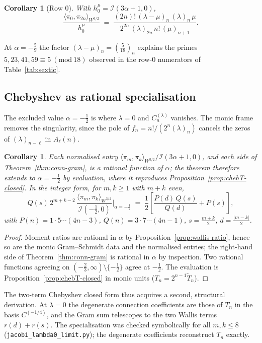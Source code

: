 \documentclass[11pt,a4paper]{article}
\newtheorem{corollary}[theorem]{Corollary}
\begin{document}
\begin{corollary}[Row $0$]\label{cor:row0}
  With $h_0^\mu=\mathcal{I}(3\alpha+1,0)$,
  \[
    \frac{\langle\pi_0,\pi_{2n}\rangle_{W^{3/2}}}{h_0^{\mu}}
    \;=\;\frac{(2n)!\,(\lambda-\mu)_n\,(\lambda)_n\,\mu}
             {2^{2n}\,(\lambda)_{2n}\,n!\,(\mu)_{n+1}}.
  \]
\end{corollary}

At $\alpha=-\tfrac59$ the factor $(\lambda-\mu)_n=(\tfrac{5}{18})_n$
explains the primes $5,23,41,59\equiv5\ (\mathrm{mod}\ 18)$ observed in the
row-$0$ numerators of Table~\ref{tab:sextic}.

\subsection{Chebyshev as rational specialisation}

The excluded value $\alpha=-\tfrac12$ is where $\lambda=0$ and
$C_n^{(\lambda)}$ vanishes.  The monic frame removes the singularity, since
the pole of $f_n=n!/(2^n(\lambda)_n)$ cancels the zeros of
$(\lambda)_{n-\ell}$ in $A_\ell(n)$.

\begin{corollary}\label{cor:lambda0}
  Each normalised entry
  $\langle\pi_m,\pi_k\rangle_{W^{3/2}}/\mathcal{I}(3\alpha+1,0)$, and each
  side of Theorem~\ref{thm:conn-gram}, is a rational function of $\alpha$;
  the theorem therefore extends to $\alpha=-\tfrac12$ by evaluation, where
  it reproduces Proposition~\ref{prop:chebT-closed}.  In the integer form,
  for $m,k\ge1$ with $m+k$ even,
  \[
    Q(s)\,2^{m+k-2}\,
    \frac{\langle\pi_m,\pi_k\rangle_{W^{3/2}}}{\mathcal{I}(-\tfrac12,0)}
    \bigg|_{\alpha=-\frac12}
    \;=\;\frac12\left[\frac{P(d)\,Q(s)}{Q(d)}+P(s)\right],
  \]
  with $P(n)=1\cdot5\cdots(4n-3)$, $Q(n)=3\cdot7\cdots(4n-1)$,
  $s=\tfrac{m+k}2$, $d=\tfrac{|m-k|}2$.
\end{corollary}

\begin{proof}
  Moment ratios are rational in $\alpha$ by
  Proposition~\ref{prop:wallis-ratio}, hence so are the monic Gram--Schmidt
  data and the normalised entries; the right-hand side of
  Theorem~\ref{thm:conn-gram} is rational in $\alpha$ by inspection.  Two
  rational functions agreeing on $(-\tfrac23,\infty)\setminus\{-\tfrac12\}$
  agree at $-\tfrac12$.  The evaluation is
  Proposition~\ref{prop:chebT-closed} in monic units
  ($T_n=2^{n-1}\widetilde T_n$).
\end{proof}

The two-term Chebyshev closed form thus acquires a second, structural
derivation.  At $\lambda=0$ the degenerate connection coefficients are
those of $T_n$ in the basis $C^{(-1/4)}$, and the Gram sum telescopes to
the two Wallis terms $r(d)+r(s)$.  The specialisation was checked
symbolically for all $m,k\le8$
(\texttt{jacobi\_lambda0\_limit.py}); the degenerate coefficients
reconstruct $T_n$ exactly.
\end{document}
